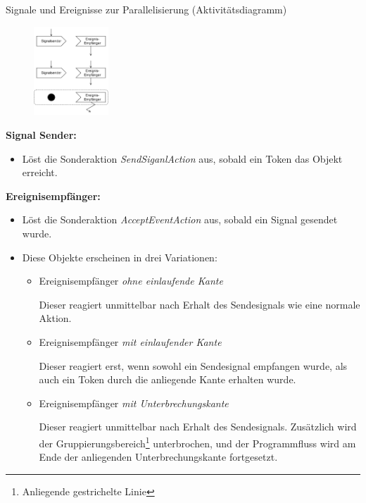 \begin{defi}{Signale und Ereignisse zur Parallelisierung (Aktivitätsdiagramm)}
    \begin{figure}
        \centering
        \includegraphics[width=0.25\textwidth]{includes/figures/defi_diagrams_activity_signal.pdf}
    \end{figure}
    \textbf{Signal Sender:}
    \begin{itemize}
        \item Löst die Sonderaktion \emph{SendSiganlAction} aus, sobald ein Token das Objekt erreicht.
    \end{itemize}

    \textbf{Ereignisempfänger:}
    \begin{itemize}
        \item Löst die Sonderaktion \emph{AcceptEventAction} aus, sobald ein Signal gesendet wurde.
        \item Diese Objekte erscheinen in drei Variationen:
              \begin{itemize}
                  \item Ereignisempfänger \emph{ohne einlaufende Kante}

                        Dieser reagiert unmittelbar nach Erhalt des Sendesignals wie eine normale Aktion.
                  \item Ereignisempfänger \emph{mit einlaufender Kante}

                        Dieser reagiert erst, wenn sowohl ein Sendesignal empfangen wurde, als auch ein Token durch die anliegende Kante erhalten wurde.
                  \item Ereignisempfänger \emph{mit Unterbrechungskante}

                        Dieser reagiert unmittelbar nach Erhalt des Sendesignals.
                        Zusätzlich wird der Gruppierungsbereich\footnote{Anliegende gestrichelte Linie} unterbrochen, und der Programmfluss wird am Ende der anliegenden Unterbrechungskante fortgesetzt.
              \end{itemize}
    \end{itemize}
\end{defi}

